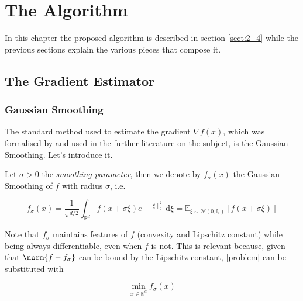 
\chapter{The Algorithm}\label{chapt:2}

In this chapter the proposed algorithm is described in section \ref{sect:2_4} while the previous sections explain the various pieces that compose it.


\section{The Gradient Estimator}

\subsection{Gaussian Smoothing}

The standard method used to estimate the gradient $\nabla f(x)$, which was formalised by \cite{nesterov2017random} and used in the further literature on the subject, is the Gaussian Smoothing. Let's introduce it.

\begin{defn}\label{GaussianSmoothingDefn}

	Let $\sigma > 0$ the \textit{smoothing parameter}, then we denote by $f_\sigma (x)$ the Gaussian Smoothing of $f$ with radius $\sigma$, i.e.
	
	\begin{equation}
	    f_{\sigma}(x)=\frac{1}{\pi^{d / 2}} \int_{\mathbb{R}^{d}} f(x+\sigma \xi) e^{-\|\xi\|_{2}^{2}} \mathrm{~d} \xi=\mathbb{E}_{\xi \sim \mathcal{N}\left(0, \mathbb{I}_{i}\right)}[f(x+\sigma \xi)]
	\end{equation}

\end{defn}

Note that $f_\sigma$ maintains features of $f$ (convexity and Lipschitz constant) while being always differentiable, even when $f$ is not. This is relevant because, given that $\norm{f - f_\sigma}$ can be bound by the Lipschitz constant, \ref{problem} can be substituted with

\begin{equation}\label{smoothed problem}
    \min _{x \in \mathbb{R}^{d}} f_\sigma (x)  
\end{equation}

